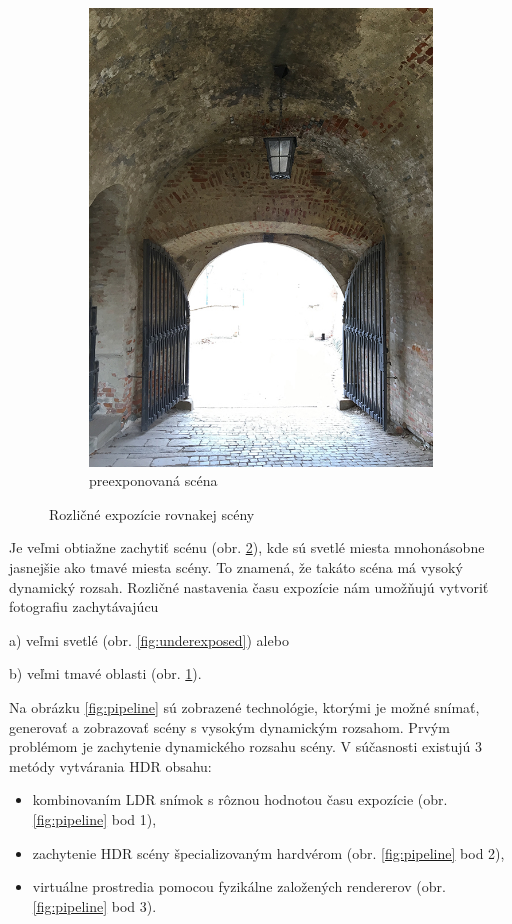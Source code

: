 \begin{figure}[t]
\begin{subfigure}{0.3\textwidth}
        \includegraphics[width=\textwidth]{figures/capturing/exposures/overexposed}
        \caption{preexponovaná scéna}
        \label{fig:overexposed}
    \end{subfigure}
    \caption{Rozličné expozície rovnakej scény}
    \label{fig:exposed_scene}
\end{figure}

Je veľmi obtiažne zachytiť scénu (obr. \ref{fig:exposed_scene}), kde sú svetlé miesta mnohonásobne jasnejšie ako
tmavé miesta scény. To znamená, že takáto scéna má vysoký dynamický rozsah.
Rozličné nastavenia času expozície nám umožňujú vytvoriť fotografiu zachytávajúcu

a) veľmi svetlé (obr. \ref{fig:underexposed}) alebo

b) veľmi tmavé oblasti (obr. \ref{fig:overexposed}).

Na obrázku \ref{fig:pipeline} sú zobrazené technológie, ktorými je možné snímať, generovať
a zobrazovať scény s vysokým dynamickým rozsahom. Prvým problémom je zachytenie dynamického 
rozsahu scény. V súčasnosti existujú 3 metódy vytvárania HDR obsahu:
\begin{itemize}
    \item kombinovaním LDR snímok s rôznou hodnotou času expozície (obr. \ref{fig:pipeline} bod 1),
    \item zachytenie HDR scény špecializovaným hardvérom (obr. \ref{fig:pipeline} bod 2),
    \item virtuálne prostredia pomocou fyzikálne založených rendererov (obr. \ref{fig:pipeline} bod 3).
\end{itemize}

